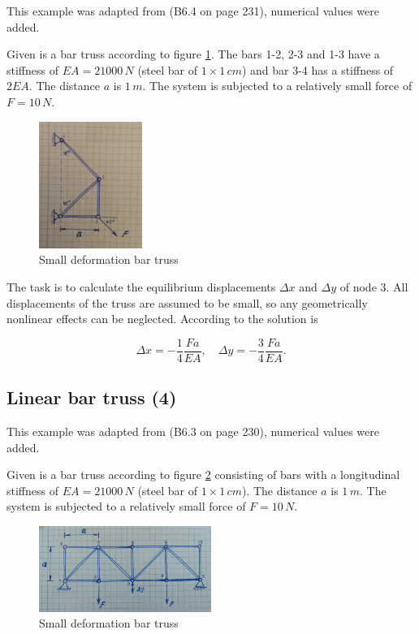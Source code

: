 This example was adapted from \cite{bib:tm2} (B6.4 on page 231), numerical values were added.

Given is a bar truss according to figure \ref{fig:verification:linear-bar-truss-2}.
The bars 1-2, 2-3 and 1-3 have a stiffness of $EA = 21000\,\unit{N}$ (steel bar of $1 \times 1\,\unit{cm}$) and bar 3-4 has a stiffness of $2EA$.
The distance $a$ is $1\,\unit{m}$.
The system is subjected to a relatively small force of $F = 10\,\unit{N}$.

\begin{figure}[H]
\centering
\includegraphics[width=0.3\textwidth]{figures/verification/linear-bar-truss-2.png}
\caption{Small deformation bar truss}
\label{fig:verification:linear-bar-truss-2}
\end{figure}


The task is to calculate the equilibrium displacements $\Delta x$ and $\Delta y$ of node 3.
All displacements of the truss are assumed to be small, so any geometrically nonlinear effects can be neglected.
According to \cite{bib:tm2} the solution is

$$
\Delta x = -\frac{1}{4}\frac{Fa}{EA},\quad \Delta y = -\frac{3}{4}\frac{Fa}{EA}.
$$

\subsection*{Linear bar truss (4)}

This example was adapted from \cite{bib:tm2} (B6.3 on page 230), numerical values were added.

Given is a bar truss according to figure \ref{fig:verification:linear-bar-truss-3} consisting of bars with a longitudinal stiffness of $EA = 21000\,\unit{N}$ (steel bar of $1 \times 1\,\unit{cm}$).
The distance $a$ is $1\,\unit{m}$.
The system is subjected to a relatively small force of $F = 10\,\unit{N}$.

\begin{figure}[H]
\centering
\includegraphics[width=0.5\textwidth]{figures/verification/linear-bar-truss-3.png}
\caption{Small deformation bar truss}
\label{fig:verification:linear-bar-truss-3}
\end{figure}

